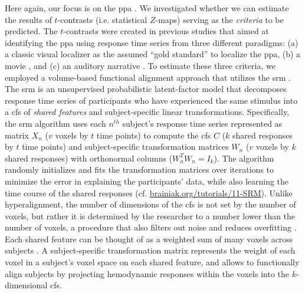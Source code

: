 Here again, our focus is on the \ac{ppa} \citep[e.g.,][for
reviews]{epstein2014neural, aminoff2013role}.
%
We investigated whether we can estimate the results of $t$-contrasts (i.e.
statistical $Z$-maps) serving as the \textit{criteria} to be predicted.
%
The $t$-contrasts were created in previous studies that aimed at identifying the
\ac{ppa} using response time series from three different paradigms:
%
(a) a classic visual localizer \citep{sengupta2016extension} as the assumed
``gold standard'' to localize the \ac{ppa},
%
(b) a movie \citep{haeusler2022processing}, and
%
(c) an auditory narrative \citep{haeusler2022processing}.
%
To estimate these three criteria, we employed a volume-based functional
alignment approach that utilizes the \ac{srm} \citep{chen2015reduced,
richard2019fast}.
The \ac{srm} is an unsupervised probabilistic latent-factor model that
decomposes response time series of participants who have experienced the same
stimulus into a \ac{cfs} of \textit{shared features} \citep[also known as
\textit{shared feature space};][]{chen2015reduced} and subject-specific linear
transformations.
Specifically, the \ac{srm} algorithm uses each $n^{th}$ subject's response time
series represented as matrix $X_{n}$ ({$v$} voxels by $t$ time points) to
compute the \ac{cfs} $C$ ($k$ shared responses by $t$ time points) and
subject-specific transformation matrices $W_{n}$ ($v$ voxels by $k$ shared
responses) with orthonormal columns ($W_{n}^{T}W_{n}=I_{k}$).
The algorithm randomly initializes and fits the transformation matrices over
iterations to minimize the error in explaining the participants' data, while
also learning the time course of the shared responses (cf.
\href{https://brainiak.org/tutorials/11-SRM/}{\url{brainiak.org/tutorials/11-SRM}}).
Unlike hyperalignment, the number of dimensions of the \ac{cfs} is not set by
the number of voxels, but rather it is determined by the researcher to a number
lower than the number of voxels, a procedure that also filters out noise and
reduces overfitting \citep{chen2015reduced}.
Each shared feature can be thought of as a weighted sum of many voxels across
subjects \citep{kumar2020brainiak}.
A subject-specific transformation matrix represents the weight of each voxel in
a subject's voxel space on each shared feature, and allows to functionally align
subjects by projecting hemodynamic responses within the voxels into the
$k$-dimensional \ac{cfs}.

